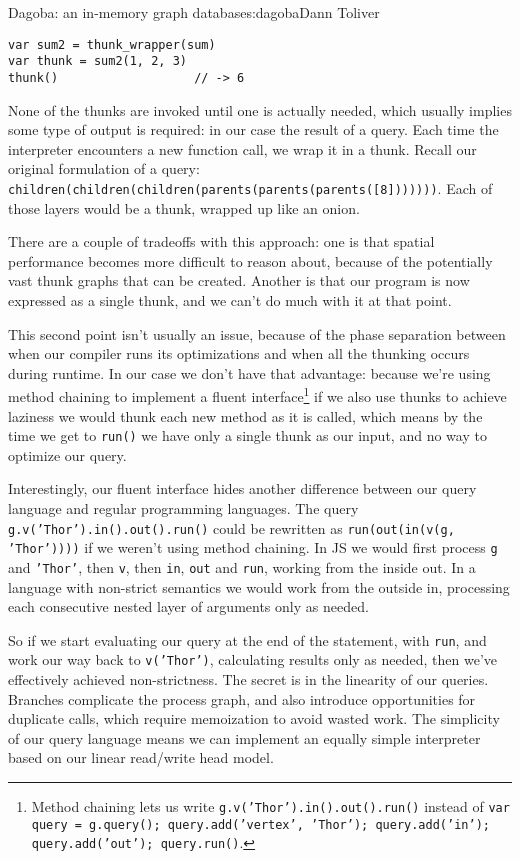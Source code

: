 \begin{aosachapter}{Dagoba: an in-memory graph database}{s:dagoba}{Dann Toliver}
\begin{verbatim}
var sum2 = thunk_wrapper(sum)
var thunk = sum2(1, 2, 3)
thunk()                   // -> 6
\end{verbatim}

None of the thunks are invoked until one is actually needed, which
usually implies some type of output is required: in our case the result
of a query. Each time the interpreter encounters a new function call, we
wrap it in a thunk. Recall our original formulation of a query:
\texttt{children(children(children(parents(parents(parents({[}8{]}))))))}.
Each of those layers would be a thunk, wrapped up like an onion.

There are a couple of tradeoffs with this approach: one is that spatial
performance becomes more difficult to reason about, because of the
potentially vast thunk graphs that can be created. Another is that our
program is now expressed as a single thunk, and we can't do much with it
at that point.

This second point isn't usually an issue, because of the phase
separation between when our compiler runs its optimizations and when all
the thunking occurs during runtime. In our case we don't have that
advantage: because we're using method chaining to implement a fluent
interface\footnote{Method chaining lets us write
  \texttt{g.v('Thor').in().out().run()} instead of
  \texttt{var query = g.query(); query.add('vertex', 'Thor'); query.add('in'); query.add('out'); query.run()}.}
if we also use thunks to achieve laziness we would thunk each new method
as it is called, which means by the time we get to \texttt{run()} we
have only a single thunk as our input, and no way to optimize our query.

Interestingly, our fluent interface hides another difference between our
query language and regular programming languages. The query
\texttt{g.v('Thor').in().out().run()} could be rewritten as
\texttt{run(out(in(v(g, 'Thor'))))} if we weren't using method chaining.
In JS we would first process \texttt{g} and \texttt{'Thor'}, then
\texttt{v}, then \texttt{in}, \texttt{out} and \texttt{run}, working
from the inside out. In a language with non-strict semantics we would
work from the outside in, processing each consecutive nested layer of
arguments only as needed.

So if we start evaluating our query at the end of the statement, with
\texttt{run}, and work our way back to \texttt{v('Thor')}, calculating
results only as needed, then we've effectively achieved non-strictness.
The secret is in the linearity of our queries. Branches complicate the
process graph, and also introduce opportunities for duplicate calls,
which require memoization to avoid wasted work. The simplicity of our
query language means we can implement an equally simple interpreter
based on our linear read/write head model.


\end{aosachapter}
